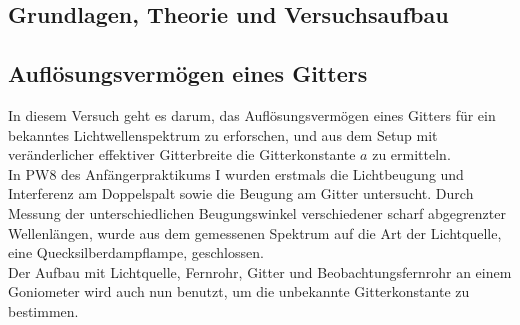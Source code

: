 \documentclass[12pt,a4paper]{article}
\begin{document}
\begin{multicols}{2}




%			



\section{Grundlagen, Theorie und Versuchsaufbau}

\subsection{Auflösungsvermögen eines Gitters}

In diesem Versuch geht es darum, das Auflösungsvermögen eines Gitters für ein bekanntes Lichtwellenspektrum zu erforschen, und aus dem Setup mit veränderlicher effektiver Gitterbreite die Gitterkonstante $a$ zu ermitteln.\\
In PW8 des Anfängerpraktikums I wurden erstmals die Lichtbeugung und Interferenz am Doppelspalt sowie die Beugung am Gitter untersucht. Durch Messung der unterschiedlichen Beugungswinkel verschiedener scharf abgegrenzter Wellenlängen, wurde aus dem gemessenen Spektrum auf die Art der Lichtquelle, eine Quecksilberdampflampe, geschlossen.\\
Der Aufbau mit Lichtquelle, Fernrohr, Gitter und Beobachtungsfernrohr an einem Goniometer wird auch nun benutzt, um die unbekannte Gitterkonstante zu bestimmen.\\


\end{multicols}
\end{document}
